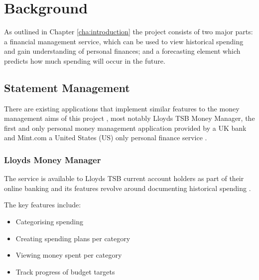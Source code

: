 \chapter{Background}
\label{cha:background}

\begin{comment}
Chapter 2: Background and literature survey
This chapter should give essential background information with references to published material in research papers, books, URLs, magazine articles and even newspapers. Expand on any references to other work that have been mentioned in Chapter 1. Refer to the notes on references (below) for the preferred way of referencing publications. The reader, stimulated by the presentation of ideas in this section, may be led to consult some or all of the referenced publications. This section will be useful for any student in a subsequent year who wishes to take the project further.
\end{comment}

As outlined in Chapter \ref{cha:introduction} the project consists of two major parts: a financial management service, which can be used to view historical spending and gain understanding of personal finances; and a forecasting element which predicts how much spending will occur in the future. 
   

\section{Statement Management}
There are existing applications that implement similar features to the money management aims of this project , most notably Lloyds TSB Money Manager, the first and only personal money management application provided by a UK bank and Mint.com a United States (US) only personal finance service \parencite{lloyds2014moneymanager, mint2014whatismint}.

\subsection{Lloyds Money Manager}
The service is available to Lloyds TSB current account holders as part of their online banking and its features revolve around documenting historical spending \parencite{lloyds2014money}.

The key features include:
\begin{itemize}
\item Categorising spending
\item Creating spending plans per category
\item Viewing money spent per category
\item Track progress of budget targets
\end{itemize}

